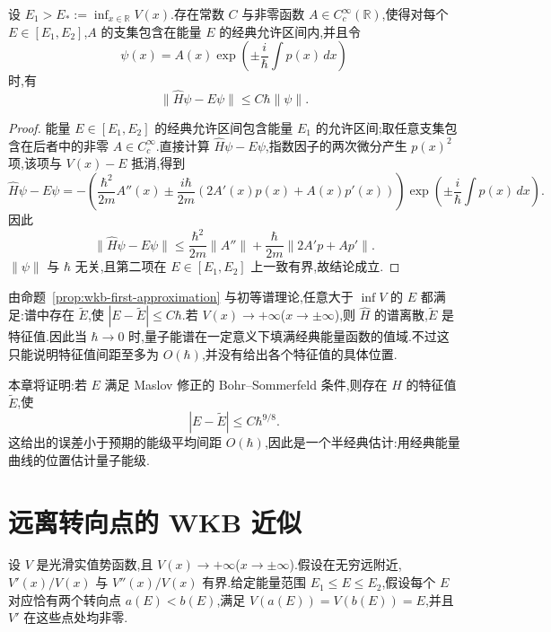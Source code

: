 \begin{proposition}\label{prop:wkb-first-approximation}
设 $E_1>E_*:=\inf_{x\in\mathbb R}V(x)$.存在常数 $C$ 与非零函数 $A\in C_c^\infty(\mathbb R)$,使得对每个 $E\in[E_1,E_2]$,$A$ 的支集包含在能量 $E$ 的经典允许区间内,并且令
\[
\psi(x)=A(x)\exp\left(\pm\frac{i}{\hbar}\int p(x)\,dx\right)
\]
时,有
\[
\|\widehat H\psi-E\psi\|\leq C\hbar\|\psi\|.
\label{eq:wkb-first-error}
\]
\end{proposition}

\begin{proof}
能量 $E\in[E_1,E_2]$ 的经典允许区间包含能量 $E_1$ 的允许区间;取任意支集包含在后者中的非零 $A\in C_c^\infty$.直接计算 $\widehat H\psi-E\psi$,指数因子的两次微分产生 $p(x)^2$ 项,该项与 $V(x)-E$ 抵消,得到
\[
\widehat H\psi-E\psi
=-\left(\frac{\hbar^2}{2m}A''(x)\pm\frac{i\hbar}{2m}(2A'(x)p(x)+A(x)p'(x))\right)
\exp\left(\pm\frac{i}{\hbar}\int p(x)\,dx\right).
\label{eq:wkb-first-computation}
\]
因此
\[
\|\widehat H\psi-E\psi\|
\leq\frac{\hbar^2}{2m}\|A''\|+\frac{\hbar}{2m}\|2A'p+Ap'\|.
\]
$\|\psi\|$ 与 $\hbar$ 无关,且第二项在 $E\in[E_1,E_2]$ 上一致有界,故结论成立.
\end{proof}

由命题~\ref{prop:wkb-first-approximation} 与初等谱理论,任意大于 $\inf V$ 的 $E$ 都满足:谱中存在 $\widetilde E$,使 $|E-\widetilde E|\leq C\hbar$.若 $V(x)\to+\infty$($x\to\pm\infty$),则 $\widehat H$ 的谱离散,$\widetilde E$ 是特征值.因此当 $\hbar\to0$ 时,量子能谱在一定意义下填满经典能量函数的值域.不过这只能说明特征值间距至多为 $O(\hbar)$,并没有给出各个特征值的具体位置.

本章将证明:若 $E$ 满足 Maslov 修正的 Bohr--Sommerfeld 条件,则存在 $\widehat H$ 的特征值 $\widetilde E$,使
\[
|E-\widetilde E|\leq C\hbar^{9/8}.
\label{eq:wkb-main-error}
\]
这给出的误差小于预期的能级平均间距 $O(\hbar)$,因此是一个半经典估计:用经典能量曲线的位置估计量子能级.

\section{远离转向点的 WKB 近似}
\label{sec:wkb-away-turning-points}

\begin{definition}\label{assumption:wkb}
设 $V$ 是光滑实值势函数,且 $V(x)\to+\infty$($x\to\pm\infty$).假设在无穷远附近,$V'(x)/V(x)$ 与 $V''(x)/V(x)$ 有界.给定能量范围 $E_1\leq E\leq E_2$,假设每个 $E$ 对应恰有两个转向点 $a(E)<b(E)$,满足 $V(a(E))=V(b(E))=E$,并且 $V'$ 在这些点处均非零.
\end{definition}

